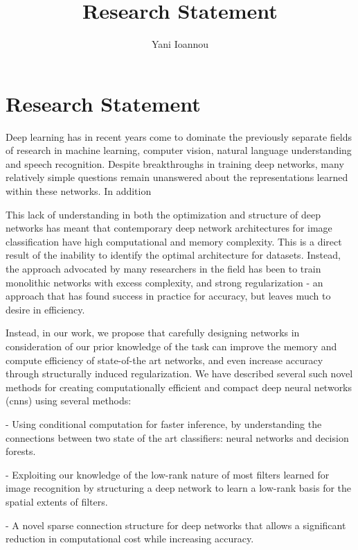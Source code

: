 \documentclass[]{article}
\title{Research Statement}
\author{Yani Ioannou}
\begin{document}
\maketitle



\section{Research Statement}
Deep learning has in recent years come to dominate the previously separate fields of research in machine learning, computer vision, natural language understanding and speech recognition. Despite breakthroughs in training deep networks, many relatively simple questions remain unanswered about the representations learned within these networks. In addition 

This lack of understanding in both the optimization and structure of deep networks has meant that contemporary deep network architectures for image classification have high computational and memory complexity. This is a direct result of the inability to identify the optimal architecture for datasets. Instead, the approach advocated by many researchers in the field has been to train monolithic networks with excess complexity, and strong regularization - an approach that has found success in practice for accuracy, but leaves much to desire in efficiency.

Instead, in our work, we propose that carefully designing networks in consideration of our prior knowledge of the task can improve the memory and compute efficiency of state-of-the art networks, and even increase accuracy through structurally induced regularization. We have described several such novel methods for creating computationally efficient and compact deep neural networks (\glspl{cnn}) using several methods:

- Using conditional computation for faster inference, by understanding the connections between two state of the art classifiers: neural networks and decision forests.

- Exploiting our knowledge of the low-rank nature of most filters learned for image recognition by structuring a deep network to learn a low-rank basis for the spatial extents of filters.

- A novel sparse connection structure for deep networks that allows a significant reduction in computational cost while increasing accuracy.
\pagebreak
\end{document}
